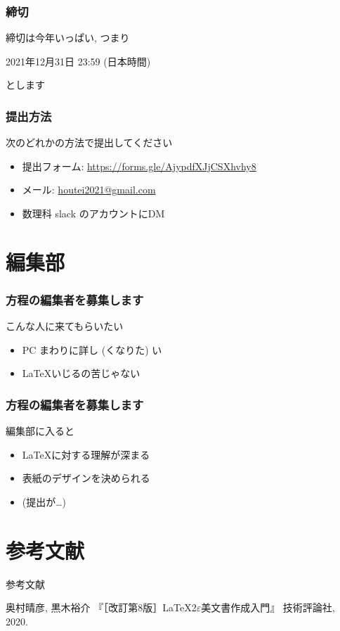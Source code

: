\documentclass[dvipdfmx,12pt,aspectratio=169]{beamer}%
\begin{document}
\begin{frame}\frametitle{締切}
    締切は今年いっぱい, つまり
    \begin{center}
        \Large{2021年12月31日 23:59 (日本時間)}
    \end{center}
    とします
\end{frame}


\begin{frame}\frametitle{提出方法}
    次のどれかの方法で提出してください
    \begin{itemize}
        \item 提出フォーム: \url{https://forms.gle/AjypdfXJjCSXhvhy8}
        \item メール: \url{houtei2021@gmail.com}
        \item 数理科 slack のアカウントにDM
    \end{itemize}
\end{frame}

\section{編集部}

\begin{frame}\frametitle{方程の編集者を募集します}
    こんな人に来てもらいたい
    \begin{itemize}
        \item PC まわりに詳し (くなりた) い
        \item \LaTeX いじるの苦じゃない
    \end{itemize}
\end{frame}

\begin{frame}\frametitle{方程の編集者を募集します}
    編集部に入ると
    \begin{itemize}
        \item \LaTeX に対する理解が深まる
        \item 表紙のデザインを決められる
        \item (提出が\ldots)
    \end{itemize}
\end{frame}

\section{参考文献}

\begin{frame}[allowframebreaks]{参考文献}
    \begin{thebibliography}{木下99}\beamertemplatetextbibitems
         奥村晴彦, 黒木裕介
        『［改訂第8版］LaTeX2$\varepsilon$美文書作成入門』
        技術評論社, 2020.
    \end{thebibliography}
\end{frame}
\end{document}
